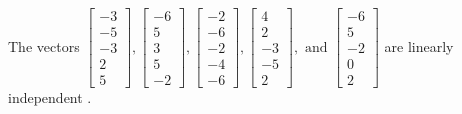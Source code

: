\begin{exercise}
\begin{exerciseStatement}
  \end{exerciseStatement}
  \begin{exerciseAnswer}
   The vectors \(\left[\begin{array}{r}
-3 \\
-5 \\
-3 \\
2 \\
5
\end{array}\right] , \left[\begin{array}{r}
-6 \\
5 \\
3 \\
5 \\
-2
\end{array}\right] , \left[\begin{array}{r}
-2 \\
-6 \\
-2 \\
-4 \\
-6
\end{array}\right] , \left[\begin{array}{r}
4 \\
2 \\
-3 \\
-5 \\
2
\end{array}\right] , \text{ and } \left[\begin{array}{r}
-6 \\
5 \\
-2 \\
0 \\
2
\end{array}\right]\) are 
  	 linearly independent  .
  


  \end{exerciseAnswer}
\end{exercise}